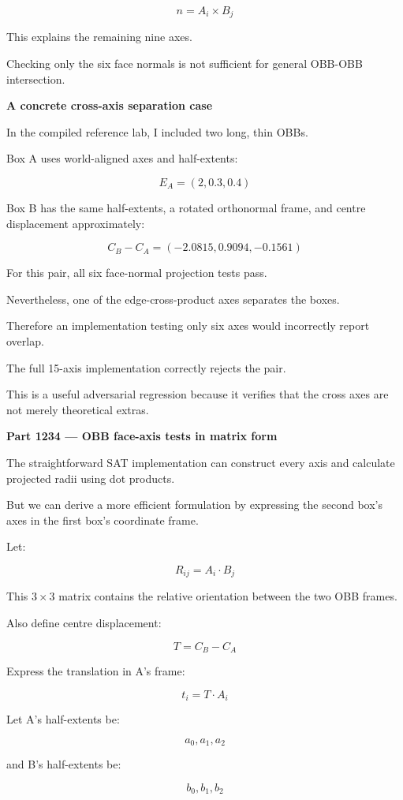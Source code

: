 \[
\boxed{ n=A_i\times B_j }
\]

This explains the remaining nine axes.

Checking only the six face normals is not sufficient for general OBB-OBB intersection.

\textbf{A concrete cross-axis separation case}

In the compiled reference lab, I included two long, thin OBBs.

Box A uses world-aligned axes and half-extents:

\[
E_A=(2,0.3,0.4)
\]

Box B has the same half-extents, a rotated orthonormal frame, and centre displacement approximately:

\[
C_B-C_A=(-2.0815,0.9094,-0.1561)
\]

For this pair, all six face-normal projection tests pass.

Nevertheless, one of the edge-cross-product axes separates the boxes.

Therefore an implementation testing only six axes would incorrectly report overlap.

The full 15-axis implementation correctly rejects the pair.

This is a useful adversarial regression because it verifies that the cross axes are not merely theoretical extras.

\textbf{Part 1234 --- OBB face-axis tests in matrix form}

The straightforward SAT implementation can construct every axis and calculate projected radii using dot products.

But we can derive a more efficient formulation by expressing the second box's axes in the first box's coordinate frame.

Let:

\[
\boxed{ R_{ij}=A_i\cdot B_j }
\]

This \(3\times3\) matrix contains the relative orientation between the two OBB frames.

Also define centre displacement:

\[
T=C_B-C_A
\]

Express the translation in A's frame:

\[
\boxed{ t_i=T\cdot A_i }
\]

Let A's half-extents be:

\[
a_0,a_1,a_2
\]

and B's half-extents be:

\[
b_0,b_1,b_2
\]

